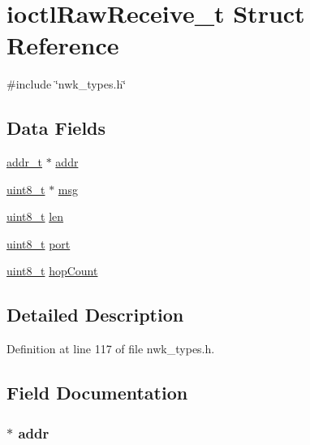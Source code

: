\hypertarget{structioctlRawReceive__t}{\section{ioctl\-Raw\-Receive\-\_\-t \-Struct \-Reference}
\label{structioctlRawReceive__t}
}


{\ttfamily \#include \char`\"{}nwk\-\_\-types.\-h\char`\"{}}

\subsection*{\-Data \-Fields}
\begin{DoxyCompactItemize}
\item 
\hyperlink{structaddr__t}{addr\-\_\-t} $\ast$ \hyperlink{structioctlRawReceive__t_a70c419570d87a9b47ee1157e2c0327f0}{addr}
\item 
\hyperlink{bsp__msp430__defs_8h_aba7bc1797add20fe3efdf37ced1182c5}{uint8\-\_\-t} $\ast$ \hyperlink{structioctlRawReceive__t_a8dd37bf01473e324d7c15a19fd211de9}{msg}
\item 
\hyperlink{bsp__msp430__defs_8h_aba7bc1797add20fe3efdf37ced1182c5}{uint8\-\_\-t} \hyperlink{structioctlRawReceive__t_a5723e60ffd628510c699eddbce90be23}{len}
\item 
\hyperlink{bsp__msp430__defs_8h_aba7bc1797add20fe3efdf37ced1182c5}{uint8\-\_\-t} \hyperlink{structioctlRawReceive__t_a2fa54f9024782843172506fadbee2ac8}{port}
\item 
\hyperlink{bsp__msp430__defs_8h_aba7bc1797add20fe3efdf37ced1182c5}{uint8\-\_\-t} \hyperlink{structioctlRawReceive__t_a95f97d42c2a291fbda2d2b4e82e12391}{hop\-Count}
\end{DoxyCompactItemize}


\subsection{\-Detailed \-Description}


\-Definition at line 117 of file nwk\-\_\-types.\-h.



\subsection{\-Field \-Documentation}
\hypertarget{structioctlRawReceive__t_a70c419570d87a9b47ee1157e2c0327f0}{
\subsubsection[{addr}]{$\ast$ {\bf addr}}}\label{structioctlRawReceive__t_a70c419570d87a9b47ee1157e2c0327f0}


